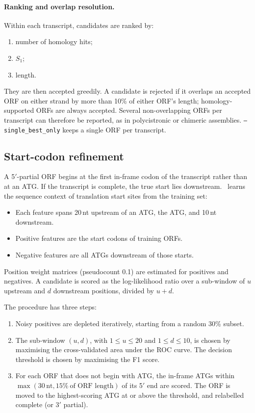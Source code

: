 \paragraph{Ranking and overlap resolution.} Within each transcript, candidates are ranked by:
\begin{enumerate}
  \item number of homology hits;
  \item $S_1$;
  \item length.
\end{enumerate}
They are then accepted greedily. A candidate is rejected if it overlaps an accepted ORF on either
strand by more than 10\% of either ORF's length; homology-supported ORFs are always accepted.
Several non-overlapping ORFs per transcript can therefore be reported, as in polycistronic or
chimeric assemblies. \texttt{--single\_best\_only} keeps a single ORF per transcript.

\subsection{Start-codon refinement}
\label{sec:start}
A 5$'$-partial ORF begins at the first in-frame codon of the transcript rather than at an ATG. If
the transcript is complete, the true start lies downstream. \TD\ learns the sequence context of
translation start sites from the training set:
\begin{itemize}
  \item Each feature spans 20\,nt upstream of an ATG, the ATG, and 10\,nt downstream.
  \item Positive features are the start codons of training ORFs.
  \item Negative features are all ATGs downstream of those starts.
\end{itemize}
Position weight matrices (pseudocount 0.1) are estimated for positives and negatives. A candidate is
scored as the log-likelihood ratio over a sub-window of $u$ upstream and $d$ downstream positions,
divided by $u+d$.

The procedure has three steps:
\begin{enumerate}
  \item Noisy positives are depleted iteratively, starting from a random 30\% subset.
  \item The sub-window $(u,d)$, with $1\le u\le20$ and $1\le d\le10$, is chosen by maximising the
        cross-validated area under the ROC curve. The decision threshold is chosen by maximising
        the F1 score.
  \item For each ORF that does not begin with ATG, the in-frame ATGs within
        $\max(30\,\mathrm{nt}, 15\%\ \text{of ORF length})$ of its 5$'$ end are scored. The ORF is
        moved to the highest-scoring ATG at or above the threshold, and relabelled complete (or
        3$'$ partial).
\end{enumerate}

